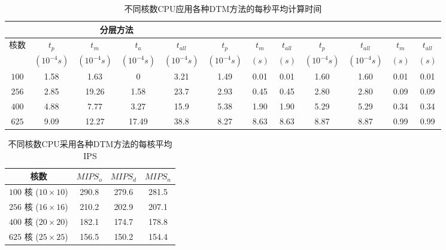  \begin{table*}
   \tabcolsep=2pt
    \caption{不同核数CPU应用各种DTM方法的每秒平均计算时间\label{tab:time}}{
    \begin{tabular}{|c|c|c|c|c|c|c|c|c|c|c|c|}
    \hline
   	        & \multicolumn{4}{c|}{分层方法} & \multicolumn{3}{c|}{\cite{MaWang:APCCAS'14}} & \multicolumn{2}{c|}{\cite{Zanini:ECCTD'09}}& \multicolumn{2}{c|}{\cite{Hanumaiah:TCAD'11}} \\
    \hline
   核数	& $t_p$ & $t_m$ &$t_a$ &
   $t_{all}$ & $t_p$ & $t_m$ &$t_{all}$  &
   $t_p$ &$t_{all}$ & $t_{m}$ &$t_{all}$\\
                                  &   $(10^{-4}s)$ & $(10^{-4}s)$ &
                                  $(10^{-4}s)$ & $(10^{-4}s)$ & $(10^{-4}s)$
                                  &   $(s)$  & $(s)$  & $(10^{-4}s)$ & $(10^{-4}s)$ &   $(s)$  & $(s)$\\
    \hline 
    \hline
   $100$ & 1.58 & 1.63  & 0     & 3.21 & 1.49 & 0.01 & 0.01 & 1.60 & 1.60 & 0.01 & 0.01\\
    \hline
   $256$ & 2.85 & 19.26 & 1.58  & 23.7 & 2.93 & 0.45 & 0.45 & 2.80 & 2.80 & 0.09 & 0.09\\
    \hline
   $400$ & 4.88 & 7.77  & 3.27  & 15.9 & 5.38 & 1.90 & 1.90 & 5.29 & 5.29 & 0.34 & 0.34\\
    \hline
   $625$ & 9.09 & 12.27 & 17.49 & 38.8 & 8.27 & 8.63 & 8.63 & 8.87 & 8.87 & 0.99 & 0.99\\
    \hline
    \hline
    \end{tabular}}
    \end{table*}
   

\begin{table}
\centering
 \caption{不同核数CPU采用各种DTM方法的每核平均IPS \label{tab:ips}}{
 \begin{tabular}{|c|c|c|c|}
 \hline
 \hline
 核数  &$MIPS_o$ & $MIPS_d$  & $MIPS_n$ \\%
 \hline 
 \hline
 $100$ 核 ($10 \times 10$) & 290.8 & 279.6 & 281.5 \\%
 \hline
 $256$ 核 ($16 \times 16$) & 210.2 & 202.9 & 207.1 \\%
 \hline
 $400$ 核 ($20 \times 20$) & 182.1 & 174.7 & 178.8 \\%
 \hline
 $625$ 核 ($25 \times 25$) & 156.5 & 150.2 & 154.4 \\%
 \hline
 \hline
 \end{tabular}}
 \end{table}
 
